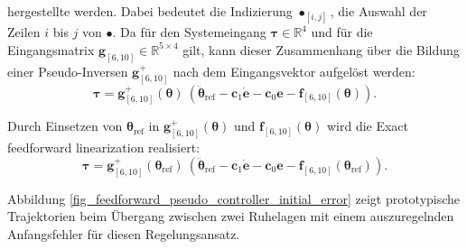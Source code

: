 hergestellte werden. Dabei bedeutet die Indizierung $\bullet_{[i, j]}$, die Auswahl der Zeilen $i$ bis $j$ von $\bullet$. Da für den Systemeingang $\boldsymbol{\tau} \in \mathbb{R}^4$ und für die Eingangsmatrix $\mathbf{g}_{[6, 10]} \in \mathbb{R}^{5 \times 4}$ gilt, kann dieser Zusammenhang über die Bildung einer Pseudo-Inversen $\mathbf{g}_{[6, 10]}^+$ nach dem Eingangsvektor aufgelöst werden:
\begin{equation}
	\boldsymbol{\tau}= \mathbf{g}^{+}_{[6, 10]} (\boldsymbol{\theta}) \ (\ddot{\boldsymbol{\theta}}_{\text{ref}} - \mathbf{c}_{1} \mathbf{\dot{e}} - \mathbf{c}_{0} \mathbf{e} - \mathbf{f}_{[6, 10]}(\boldsymbol{\theta})).
\end{equation} 

Durch Einsetzen von $\boldsymbol{\theta}_{\text{ref}}$ in $\mathbf{g}_{[6, 10]}^+(\boldsymbol{\theta})$ und $\mathbf{f}_{[6, 10]}(\boldsymbol{\theta})$ wird die Exact feedforward linearization realisiert:
\begin{equation}
\boldsymbol{\tau}= \mathbf{g}^{+}_{[6, 10]} (\boldsymbol{\theta}_{\text{ref}}) \ (\ddot{\boldsymbol{\theta}}_{\text{ref}} - \mathbf{c}_{1} \mathbf{\dot{e}} - \mathbf{c}_{0} \mathbf{e} - \mathbf{f}_{[6, 10]}(\boldsymbol{\theta}_{\text{ref}})).
\end{equation} 

Abbildung \ref{fig_feedforward_pseudo_controller_initial_error} zeigt prototypische Trajektorien beim Übergang zwischen zwei Ruhelagen mit einem auszuregelnden Anfangsfehler für diesen Regelungsansatz.


